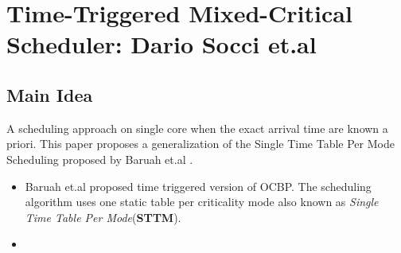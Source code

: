 \section{Time-Triggered Mixed-Critical Scheduler: Dario Socci et.al}
\subsection*{Main Idea}
A scheduling approach on single core when the exact arrival time are known a priori. This paper proposes a generalization of the Single Time Table Per Mode Scheduling proposed by Baruah et.al .
\begin{itemize}
	\item Baruah et.al proposed time triggered version of OCBP. The scheduling algorithm uses one static table per criticality mode also known as \textit{Single Time Table Per Mode}(\textbf{STTM}).
	\item 
\end{itemize}
